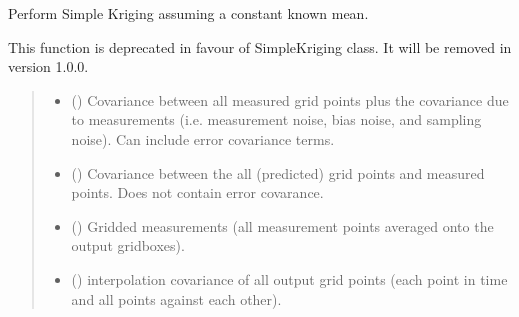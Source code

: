 \documentclass[letterpaper,10pt,english]{sphinxmanual}
\begin{document}
\begin{fulllineitems}
\label{\detokenize{kriging:glomar_gridding.kriging.kriging_simple}}
\pysigstartsignatures
\pysiglinewithargsret
{}
{\sphinxparamcomma {}\sphinxparamcomma {}\sphinxparamcomma {}\sphinxparamcomma {}}
{}
\pysigstopsignatures
\sphinxAtStartPar
Perform Simple Kriging assuming a constant known mean.

\sphinxAtStartPar
This function is deprecated in favour of SimpleKriging class. It will be
removed in version 1.0.0.
\begin{quote}\begin{description}
\begin{itemize}
\item {}
\sphinxAtStartPar
{} (\sphinxstyleliteralemphasis{\sphinxupquote{{[}}}\sphinxstyleliteralemphasis{\sphinxupquote{{]}}}) \textendash{} Covariance between all measured grid points plus the
covariance due to measurements (i.e. measurement noise, bias noise, and
sampling noise). Can include error covariance terms.

\item {}
\sphinxAtStartPar
{} (\sphinxstyleliteralemphasis{\sphinxupquote{{[}}}\sphinxstyleliteralemphasis{\sphinxupquote{{]}}}) \textendash{} Covariance between the all (predicted) grid points and measured points.
Does not contain error covarance.

\item {}
\sphinxAtStartPar
{} (\sphinxstyleliteralemphasis{\sphinxupquote{{[}}}\sphinxstyleliteralemphasis{\sphinxupquote{{]}}}) \textendash{} Gridded measurements (all measurement points averaged onto the output
gridboxes).

\item {}
\sphinxAtStartPar
{} (\sphinxstyleliteralemphasis{\sphinxupquote{{[}}}\sphinxstyleliteralemphasis{\sphinxupquote{{]}}}) \textendash{} interpolation covariance of all output grid points (each point in time
and all points against each other).


\end{itemize}
\end{description}
\end{quote}
\end{fulllineitems}
\end{document}
